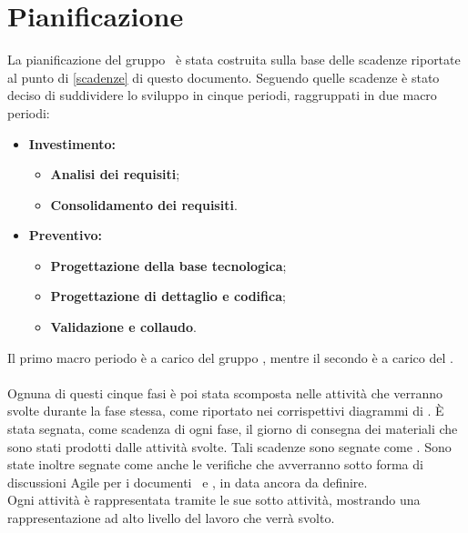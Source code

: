 \documentclass[PianoDiProgetto.tex]{subfiles}
\begin{document}
\chapter{Pianificazione}
La pianificazione del gruppo \gruppo\ è stata costruita sulla base delle scadenze riportate al punto di \ref{scadenze} di questo documento. Seguendo quelle scadenze è stato deciso di suddividere lo sviluppo in cinque periodi, raggruppati in due macro periodi:
\begin{itemize}
	\item \textbf{Investimento:}
		\begin{itemize}
			\item \textbf{Analisi dei requisiti};
			\item \textbf{Consolidamento dei requisiti}.
		\end{itemize}
	\item \textbf{Preventivo:}
		\begin{itemize}
			\item \textbf{Progettazione della base tecnologica};
			\item \textbf{Progettazione di dettaglio e codifica};
			\item \textbf{Validazione e collaudo}.
		\end{itemize}
\end{itemize}
Il primo macro periodo è a carico del gruppo \gruppo, mentre il secondo è a carico del .\\\\ %
Ognuna di questi cinque fasi è poi stata scomposta nelle attività che verranno svolte durante la fase stessa, come riportato nei corrispettivi diagrammi di . \`{E} stata segnata, come scadenza di ogni fase, il giorno di consegna dei materiali che sono stati prodotti dalle attività svolte. Tali scadenze sono segnate come .
Sono state inoltre segnate come  anche le verifiche che avverranno sotto forma di discussioni Agile per i documenti \tb\ e \pb, in data ancora da definire.\\ Ogni attività è rappresentata tramite le sue sotto attività, mostrando una rappresentazione ad alto livello del lavoro che verrà svolto.
\newpage
\end{document}
